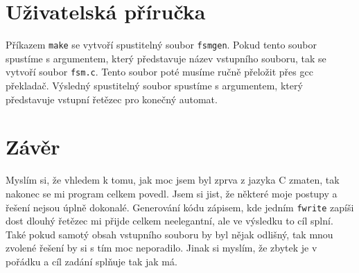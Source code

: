 \documentclass[czech,SP]{thesiskiv}
\begin{document}
\chapter{Uživatelská příručka }
{Příkazem \texttt{make} se vytvoří spustitelný soubor \texttt{fsmgen}. Pokud tento soubor spustíme s argumentem, který představuje název vstupního souboru, tak se vytvoří soubor \texttt{fsm.c}. Tento soubor poté musíme ručně přeložit přes gcc překladač. Výsledný spustitelný soubor spustíme s argumentem, který představuje vstupní řetězec pro konečný automat.}

\chapter{Závěr }
{Myslím si, že vhledem k tomu, jak moc jsem byl zprva z jazyka C zmaten, tak nakonec se mi program celkem povedl. Jsem si jist, že některé moje postupy a řešení nejsou úplně dokonalé. Generování kódu zápisem, kde jedním \texttt{fwrite} zapíši dost dlouhý řetězec mi přijde celkem neelegantní, ale ve výsledku to cíl splní. Také pokud samotý obsah vstupního souboru by byl nějak odlišný, tak mnou zvolené řešení by si s tím moc neporadilo. Jinak si myslím, že zbytek je v pořádku a cíl zadání splňuje tak jak má.}


 
\end{document}
